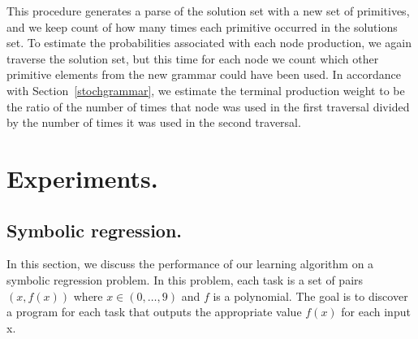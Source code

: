 \documentclass{article}
\begin{document}

This procedure generates a parse of the solution set with a new set of
primitives, and we keep count of how many times each primitive
occurred in the solutions set. To estimate the probabilities
associated with each node production, we again traverse the solution
set, but this time for each node we count which other primitive
elements from the new grammar could have been used. In accordance with
Section~\ref{stochgrammar}, we estimate the terminal production weight
to be the ratio of the number of times that node was used in the first
traversal divided by the number of times it was used in the second
traversal.

\section{Experiments.}
\subsection{Symbolic regression.}
\label{sec:symreg}

In this section, we discuss the performance of our learning algorithm
on a symbolic regression problem. In this problem, each task is a set
of pairs $ (x, f(x))$ where $x \in (0, \dots, 9)$ and $f$ is a
polynomial. The goal is to discover a program for each task that
outputs the appropriate value $f(x)$ for each input x. 

\end{document}
